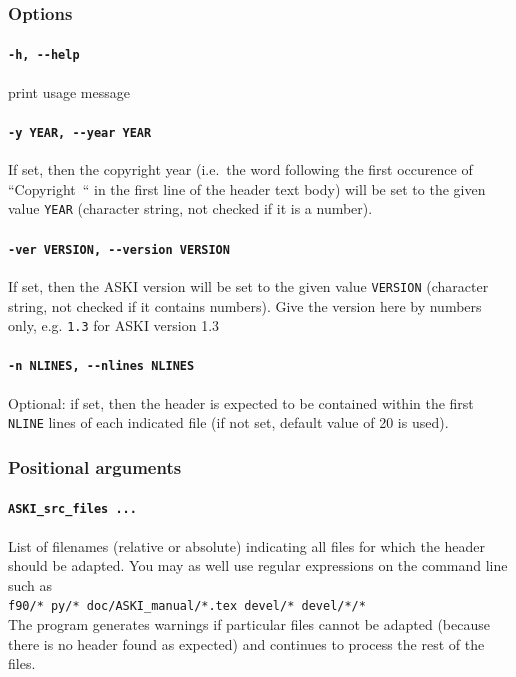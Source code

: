 \documentclass[12pt,a4paper]{article}
\newcommand{\lcode}[1]{\nolinkurl{#1}}
\newcommand{\ASKI}{ {\ttfamily ASKI} }
\begin{document}
\subsubsection{Options}
\paragraph{\lcode{-h, --help}}
print usage message
\paragraph{\lcode{-y YEAR, --year YEAR}}
If set, then the copyright year (i.e.\ the word following the first occurence of ``Copyright~`` in the 
first line of the header text body) will be set to the given value \lcode{YEAR} (character string, not 
checked if it is a number).
\paragraph{\lcode{-ver VERSION, --version VERSION}}
If set, then the \ASKI{} version will be set to the given value \lcode{VERSION}
(character string, not checked if it contains numbers). Give the version here
by numbers only, e.g. \lcode{1.3} for \ASKI{} version 1.3
\paragraph{\lcode{-n NLINES, --nlines NLINES}}
Optional: if set, then the header is expected to be contained within
the first \lcode{NLINE} lines of each indicated file (if not set, default value of 20 is used).

\subsubsection{Positional arguments}
\paragraph{\lcode{ASKI_src_files ...}}
List of filenames (relative or absolute) indicating all files for which the header should be adapted.
You may as well use regular expressions on the command line such as\\
\lcode{f90/* py/* doc/ASKI_manual/*.tex devel/* devel/*/*}\\
The program generates warnings if particular files cannot be adapted (because there is no header found
as expected) and continues to process the rest of the files. 
\end{document}
